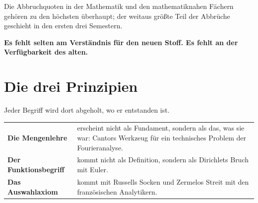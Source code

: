 \begin{merksatz}
Die Abbruchquoten in der Mathematik und den mathematiknahen Fächern gehören zu den höchsten überhaupt; der weitaus größte Teil der Abbrüche geschieht in den ersten drei Semestern.

\begin{center}
\begin{minipage}{0.9\textwidth}
\textbf{Es fehlt selten am Verständnis für den neuen Stoff. Es fehlt an der Verfügbarkeit des alten.}
\end{minipage}
\end{center}

\begin{center}
\begin{minipage}{0.88\textwidth}
\end{minipage}
\end{center}
\end{merksatz}

\section*{Die drei Prinzipien}

\begin{merksatz}
Jeder Begriff wird dort abgeholt, wo er entstanden ist.

\begin{center}
{\small
\renewcommand{\arraystretch}{1.5}
\begin{tabular}{@{}P{2.8cm}P{5.8cm}@{}}
\toprule
\textbf{Die Mengenlehre} & erscheint nicht als Fundament, sondern als das, was sie war: Cantors Werkzeug für ein technisches Problem der Fourieranalyse.\\
\textbf{Der Funktionsbegriff} & kommt nicht als Definition, sondern als Dirichlets Bruch mit Euler.\\
\textbf{Das Auswahlaxiom} & kommt mit Russells Socken und Zermelos Streit mit den französischen Analytikern.\\
\bottomrule
\end{tabular}}
\end{center}

\begin{center}
\begin{minipage}{0.88\textwidth}
\end{minipage}
\end{center}
\end{merksatz}

